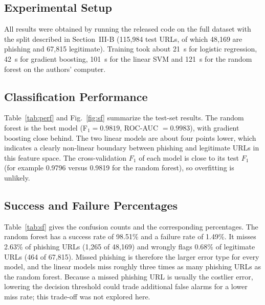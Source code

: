 \documentclass[journal]{IEEEtran}
\begin{document}
\subsection{Experimental Setup}
All results were obtained by running the released code on the full dataset with the split described in Section~III-B (115,984 test URLs, of which 48,169 are phishing and 67,815 legitimate). Training took about 21~s for logistic regression, 42~s for gradient boosting, 101~s for the linear SVM and 121~s for the random forest on the authors' computer.

\subsection{Classification Performance}
Table~\ref{tab:perf} and Fig.~\ref{fig:sf} summarize the test-set results. The random forest is the best model (F$_1=0.9819$, ROC-AUC $=0.9983$), with gradient boosting close behind. The two linear models are about four points lower, which indicates a clearly non-linear boundary between phishing and legitimate URLs in this feature space. The cross-validation $F_1$ of each model is close to its test $F_1$ (for example 0.9796 versus 0.9819 for the random forest), so overfitting is unlikely.

\begin{table}[!t]
\renewcommand{\arraystretch}{1.15}
\caption{Classifier Performance on the Held-Out Test Set (115,984 URLs)}
\label{tab:perf}
\centering
\footnotesize
{}
\end{table}

\subsection{Success and Failure Percentages}
Table~\ref{tab:sf} gives the confusion counts and the corresponding percentages. The random forest has a success rate of 98.51\% and a failure rate of 1.49\%. It misses 2.63\% of phishing URLs (1,265 of 48,169) and wrongly flags 0.68\% of legitimate URLs (464 of 67,815). Missed phishing is therefore the larger error type for every model, and the linear models miss roughly three times as many phishing URLs as the random forest. Because a missed phishing URL is usually the costlier error, lowering the decision threshold could trade additional false alarms for a lower miss rate; this trade-off was not explored here.
\end{document}
